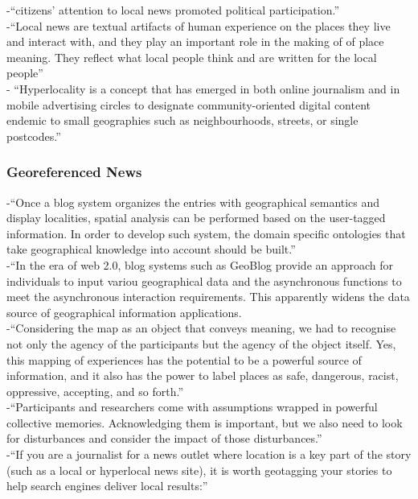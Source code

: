 -{\color{orange}“citizens’ attention to local news promoted political participation.”\cite{Cai2016}}\\
-{\color{orange}“Local news are textual artifacts of human experience on the places they live and interact with, and they play an important role in the making of of place meaning. They reflect what local people think and are written for the local people”\cite{Cai2016}}\\
-{\color{orange} “Hyperlocality is a concept that has emerged in both online journalism and in mobile advertising circles to designate community-oriented digital content endemic to small geographies such as neighbourhoods, streets, or single postcodes.”\cite{Leszczynski2019}}\\


\subsubsection{Georeferenced News}
-{\color{orange}“Once a blog system organizes the entries with geographical semantics and display localities, spatial analysis can be performed based on the user-tagged information. In order to develop such system, the domain specific ontologies that take geographical knowledge into account should be built.”}\cite{Xing2015}\\
-{\color{orange}“In the era of web 2.0, blog systems such as GeoBlog provide an approach for individuals to input variou geographical data and the asynchronous functions to meet the asynchronous interaction requirements. This apparently widens the data source of geographical information applications.}\cite{Xing2015}\\
-{\color{orange}“Considering the map as an object that conveys meaning, we had to recognise not only the agency of the participants but the agency of the object itself. Yes, this mapping of experiences has the potential to be a powerful source of information, and it also has the power to label places as safe, dangerous, racist, oppressive, accepting, and so forth.” \cite{McQueenBaker2019}}\\
-{\color{orange}“Participants and researchers come with assumptions wrapped in powerful collective memories. Acknowledging them is important, but we also need to look for disturbances and consider the impact of those disturbances.”\cite{McQueenBaker2019}}\\
-{\color{orange}“If you are a journalist for a news outlet where location is a key part of the story (such as a local or hyperlocal news site), it is worth geotagging your stories to help search engines deliver local results:”\cite{Marshall2012}}\\
